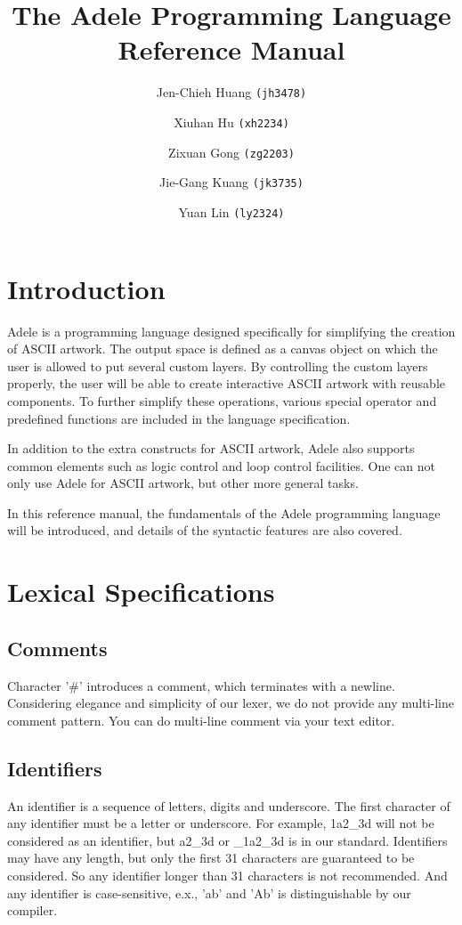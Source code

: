 \documentclass[11pt,letterpaper]{article}
\begin{document}
\title {The Adele Programming Language \\ Reference Manual}
\author {
	Jen-Chieh Huang \texttt{(jh3478)} \and Xiuhan Hu \texttt{(xh2234)} \and     
	Zixuan Gong \texttt{(zg2203)} \and Jie-Gang Kuang \texttt{(jk3735)} \and 
	Yuan Lin \texttt{(ly2324)}
}
\maketitle
\pagebreak
\begin{changemargin}{-0.5cm}{-0.5cm} 
\setcounter{tocdepth}{3}
\tableofcontents
\end{changemargin}
\pagebreak
\section {Introduction}
Adele is a programming language designed specifically for simplifying the creation of ASCII artwork. The output space is defined as a canvas object on which the user is allowed to put several custom layers. By controlling the custom layers properly, the user will be able to create interactive ASCII artwork with reusable components. To further simplify these operations, various special operator and predefined functions are included in the language specification.

In addition to the extra constructs for ASCII artwork, Adele also supports common elements such as logic control and loop control facilities. One can not only use Adele for ASCII artwork, but other more general tasks.

In this reference manual, the fundamentals of the Adele programming language will be introduced, and details of the syntactic features are also covered.

\section {Lexical Specifications}
\subsection {Comments}
Character '\#' introduces a comment, which terminates with a newline. Considering elegance and simplicity of our lexer, we do not provide any multi-line comment pattern. You can do multi-line comment via your text editor.

\subsection {Identifiers}
An identifier is a sequence of letters, digits and underscore. The first character of any identifier must be a letter or underscore. For example, 1a2\_3d will not be considered as an identifier, but a2\_3d or \_1a2\_3d is in our standard. Identifiers may have any length, but only the first 31 characters are guaranteed to be considered. So any identifier longer than 31 characters is not recommended. And any identifier is case-sensitive, e.x., 'ab' and 'Ab' is distinguishable by our compiler.
\end{document}
